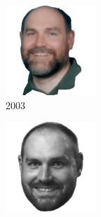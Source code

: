 \begin{figure}
\begin{subfigure}{0.19\textwidth}
\includegraphics[width=\textwidth]{images/peter_miller_2003.png}
\caption{2003}
\end{subfigure}
\begin{subfigure}{0.19\textwidth}
\includegraphics[width=\textwidth]{images/peter_miller_1993.png}

\end{subfigure}
\end{figure}
